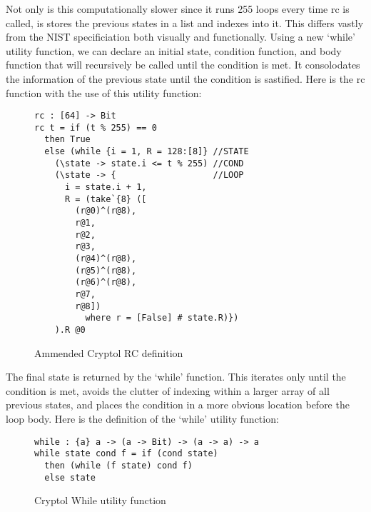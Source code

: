 Not only is this computationally slower since it runs 255 loops every time rc is called, 
is stores the previous states in a list and indexes into it. This differs vastly from the 
NIST specificiation both visually and functionally. Using a new ‘while’ utility function, we 
can declare an initial state, condition function, and body function that will recursively 
be called until the condition is met. It consolodates the information of the previous state 
until the condition is sastified. Here is the rc function with the use of this utility 
function:

\begin{figure}[h]
  \centering
\begin{verbatim}
rc : [64] -> Bit
rc t = if (t % 255) == 0 
  then True 
  else (while {i = 1, R = 128:[8]} //STATE
    (\state -> state.i <= t % 255) //COND
    (\state -> {                   //LOOP
      i = state.i + 1, 
      R = (take`{8} ([
        (r@0)^(r@8),
        r@1,
        r@2,
        r@3,
        (r@4)^(r@8),
        (r@5)^(r@8),
        (r@6)^(r@8),
        r@7, 
        r@8]) 
          where r = [False] # state.R)})
    ).R @0
\end{verbatim}
\caption{Ammended Cryptol RC definition}
\label{fig:cryptolAmmendedRC}
\end{figure}

The final state is returned by the ‘while’ function. This iterates only until the 
condition is met, avoids the clutter of indexing within a larger array of all previous 
states, and places the condition in a more obvious location before the loop body. Here 
is the definition of the ‘while’ utility function:

\begin{figure}[h]
  \centering
\begin{verbatim}
while : {a} a -> (a -> Bit) -> (a -> a) -> a
while state cond f = if (cond state)
  then (while (f state) cond f)	
  else state
\end{verbatim}
\caption{Cryptol While utility function}
\label{fig:cryptolWhile}
\end{figure}